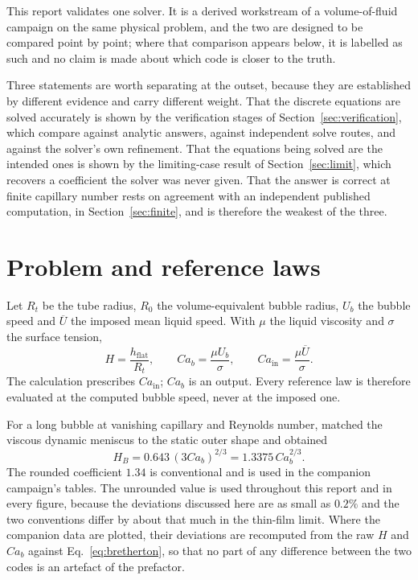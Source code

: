 \documentclass[11pt,a4paper]{article}
\begin{document}
This report validates one solver. It is a derived workstream of a
volume-of-fluid campaign on the same physical problem, and the two are designed
to be compared point by point; where that comparison appears below, it is
labelled as such and no claim is made about which code is closer to the truth.

Three statements are worth separating at the outset, because they are
established by different evidence and carry different weight. That the discrete
equations are solved accurately is shown by the verification stages of
Section~\ref{sec:verification}, which compare against analytic answers, against
independent solve routes, and against the solver's own refinement. That the
equations being solved are the intended ones is shown by the limiting-case
result of Section~\ref{sec:limit}, which recovers a coefficient the solver was
never given. That the answer is correct at finite capillary number rests on
agreement with an independent published computation, in
Section~\ref{sec:finite}, and is therefore the weakest of the three.

\section{Problem and reference laws}

Let $R_t$ be the tube radius, $R_0$ the volume-equivalent bubble radius, $U_b$
the bubble speed and $\overline U$ the imposed mean liquid speed. With $\mu$
the liquid viscosity and $\sigma$ the surface tension,
\begin{equation}
  H=\frac{h_{\mathrm{flat}}}{R_t},\qquad
  Ca_b=\frac{\mu U_b}{\sigma},\qquad
  Ca_{\mathrm{in}}=\frac{\mu\overline U}{\sigma}.
  \label{eq:definitions}
\end{equation}
The calculation prescribes $Ca_{\mathrm{in}}$; $Ca_b$ is an output. Every
reference law is therefore evaluated at the computed bubble speed, never at the
imposed one.

For a long bubble at vanishing capillary and Reynolds number,
\citet{bretherton1961motion} matched the viscous dynamic meniscus to the static
outer shape and obtained
\begin{equation}
  H_B=0.643\,(3Ca_b)^{2/3}=1.3375\,Ca_b^{2/3}.
  \label{eq:bretherton}
\end{equation}
The rounded coefficient $1.34$ is conventional and is used in the companion
campaign's tables. The unrounded value is used throughout this report and in
every figure, because the deviations discussed here are as small as $0.2\%$ and
the two conventions differ by about that much in the thin-film limit. Where the
companion data are plotted, their deviations are recomputed from the raw $H$
and $Ca_b$ against Eq.~\eqref{eq:bretherton}, so that no part of any difference
between the two codes is an artefact of the prefactor.
\end{document}
